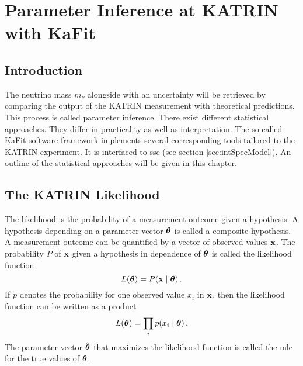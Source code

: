 

\chapter{Parameter Inference at KATRIN with KaFit}
\section{Introduction}
The neutrino mass $m_\nu$ alongside with an uncertainty will be retrieved by comparing the output of the KATRIN measurement with theoretical predictions. This process is called parameter inference. There exist different statistical approaches. They differ in practicality as well as interpretation. The so-called KaFit software framework implements several corresponding tools tailored to the KATRIN experiment. It is interfaced to \gls{ssc} (see section \ref{sec:intSpecModel}). An outline of the statistical approaches will be given in this chapter.  

\section{The KATRIN Likelihood}
The likelihood is the probability of a measurement outcome given a hypothesis. A hypothesis depending on a parameter vector $\boldsymbol{\mathbf{\theta}}$ is called a composite hypothesis. A measurement outcome can be quantified by a vector of observed values $\boldsymbol{\mathbf{x}}$. The probability $P$ of $\boldsymbol{\mathbf{x}}$ given a hypothesis in dependence of $\boldsymbol{\mathbf{\theta}}$ is called the likelihood function
\begin{equation}
	L(\paramVec) = P\giventhat{\dataVec}{\paramVec}
	\fullstop
\end{equation}
If $p$ denotes the probability for one observed value $x_i$ in $\boldsymbol{\mathbf{x}}$, then the likelihood function can be written as a product
\begin{equation}
	L(\paramVec) = \prod_{i} p\giventhat{x_i}{\paramVec}
	\fullstop
\end{equation}
The parameter vector $\hat{\boldsymbol{\mathbf{\theta}}}$ that maximizes the likelihood function is called the \gls{mle} for the true values of $\boldsymbol{\mathbf{\theta}}$.

